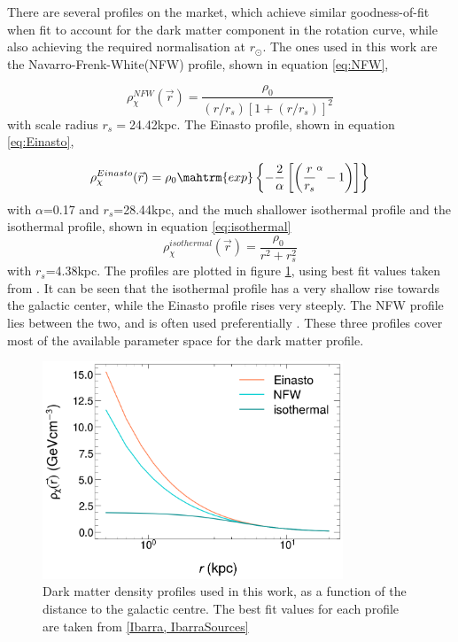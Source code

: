 There are several profiles on the market, which achieve similar goodness-of-fit when fit to account for the dark matter component in the rotation curve\cite{}, while also achieving the required normalisation at $r_\odot$. The ones used in this work are the Navarro-Frenk-White(NFW) profile\cite{}, shown in equation \ref{eq:NFW}, 

\begin{equation}\label{eq:NFW}
    \rho_\chi^{NFW}(\vec{r}) = \frac{\rho_0}{(r/r_s)[1+(r/r_s)]^2}
\end{equation}
with scale radius $r_s=$24.42kpc. The Einasto profile\cite{}, shown in equation \ref{eq:Einasto}, 

\begin{equation}\label{eq:Einasto}
    \rho_\chi^{Einasto}(\vec{r}) = \rho_0 \mahtrm{exp} \left\{ -\frac{2}{\alpha}\left[ \left( \frac{r}{r_s}^\alpha -1\right) \right] \right\}
\end{equation}
with $\alpha$=0.17 and $r_s$=28.44kpc, and the much shallower isothermal profile \cite{} and the isothermal profile, shown in equation \ref{eq:isothermal}
\begin{equation}\label{eq:isothermal}
    \rho_\chi^{isothermal}(\vec{r}) = \frac{\rho_0}{r^2+r_s^2}
\end{equation}
with $r_s$=4.38kpc. The profiles are plotted in figure \ref{fig:DMProfiles}, using best fit values taken from \cite{Ibarra}. It can be seen that the isothermal profile has a very shallow rise towards the galactic center, while the Einasto profile rises very steeply. The NFW profile lies between the two, and is often used preferentially \cite{}. These three profiles cover most of the available parameter space for the dark matter profile. \\

\begin{figure}[h]
    \centering
    \includegraphics[width=0.8\textwidth]{figures/DMProfiles_distributions_log.png}
    \caption{Dark matter density profiles used in this work, as a function of the distance to the galactic centre. The best fit values for each profile are taken from \ref{Ibarra, IbarraSources}}
    \label{fig:DMProfiles}
\end{figure}

